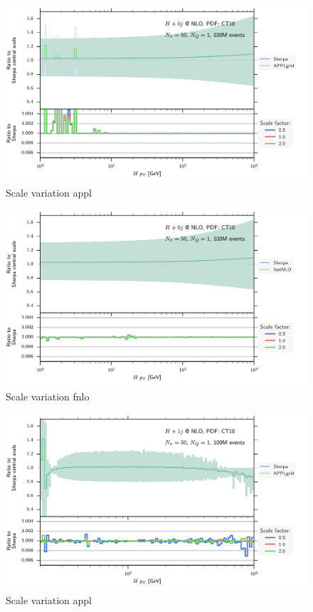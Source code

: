 %
\begin{figure}
	\centering
	\includegraphics[width=\textwidth]{images/scalesvar_hnlo_appl.pdf}
	\caption{Scale variation appl}
\end{figure}
%
\begin{figure}
	\centering
	\includegraphics[width=\textwidth]{images/scalesvar_hnlo_fnlo.pdf}
	\caption{Scale variation fnlo}
\end{figure}
%
\begin{figure}
	\centering
	\includegraphics[width=\textwidth]{images/scalesvar_hjnlo_appl.pdf}
	\caption{Scale variation appl}
\end{figure}
